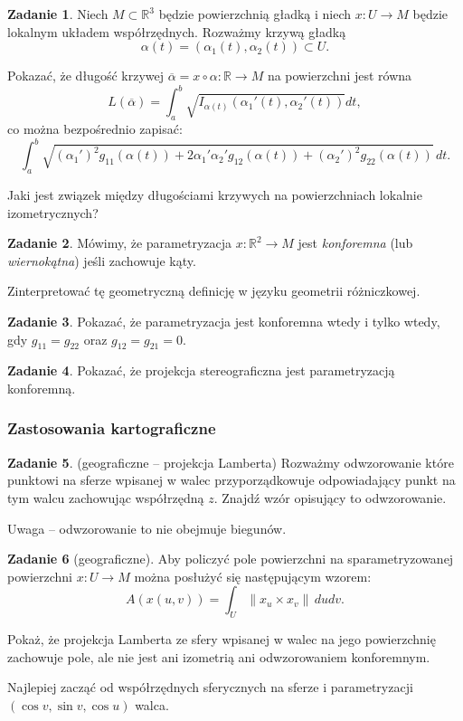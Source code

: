 \documentclass[a4paper,11pt]{article}
\theoremstyle{definition}\newtheorem{exercise}{Zadanie}
\theoremstyle{definition}\newtheorem{remark}{Uwaga}
\begin{document}
\begin{exercise}
Niech $M\subset \mathbb{R}^3$ będzie powierzchnią gładką i niech $x\colon U\to 
M$ będzie lokalnym układem współrzędnych. Rozważmy krzywą gładką 
\[\alpha(t)=(\alpha_1(t),\alpha_2(t))\subset U.\]

Pokazać, że długość krzywej $\overline{\alpha}=x\circ\alpha\colon \mathbb{R}\to 
M$ na powierzchni jest równa
\[L(\overline{\alpha})=\int_a^b\sqrt{I_{\alpha(t)}\left(\alpha_1 '(t),\alpha_2 
'(t)\right)}dt,\]
co można bezpośrednio zapisać:
\[\int_a^b\sqrt{\left(\alpha_1'\right)^2 g_{11}(\alpha(t))+ 2 
\alpha_1'\alpha_2'g_{12}(\alpha(t))+\left(\alpha_2'\right)^2 
g_{22}(\alpha(t))}\,dt.\]

Jaki jest związek między długościami krzywych na powierzchniach lokalnie 
izometrycznych?
\end{exercise} 
 

\begin{exercise}
 M\'owimy, że parametryzacja $x\colon \mathbb{R}^2\to M$ jest 
\textit{konforemna} (lub \textit{wiernokątna}) jeśli zachowuje kąty.

Zinterpretować tę geometryczną definicję w języku geometrii r\'ożniczkowej.
\end{exercise}
 
\begin{exercise}
 Pokazać, że parametryzacja jest konforemna wtedy i tylko wtedy, gdy $g_{11} 
=g_{22} $ oraz $g_{12} =g_{21} =0$.
\end{exercise}

\begin{exercise}
 Pokazać, że projekcja stereograficzna jest parametryzacją konforemną.
\end{exercise}

\subsubsection{Zastosowania kartograficzne}

\begin{exercise}(geograficzne -- projekcja Lamberta)
Rozważmy odwzorowanie kt\'ore punktowi na sferze wpisanej w walec 
przyporządkowuje odpowiadający punkt na tym walcu zachowując wsp\'ołrzędną $z$. 
Znajdź wz\'or opisujący to odwzorowanie.

\small{Uwaga -- odwzorowanie to nie obejmuje biegun\'ow.}
\end{exercise}


\begin{exercise}[geograficzne]
Aby policzyć pole powierzchni na sparametryzowanej powierzchni $x\colon U\to M$ 
można posłużyć się następującym wzorem:
\[A\left(x(u,v)\right)=\int_U \|x_u \times x_v \|\, dudv.\]

Pokaż, że projekcja Lamberta ze sfery wpisanej w walec na jego 
powierzchnię zachowuje pole, ale nie jest ani izometrią ani  
odwzorowaniem konforemnym.

\small{Najlepiej zacząć od wsp\'ołrzędnych sferycznych na sferze i 
parametryzacji $(\cos v,\sin v, \cos u)$ walca.}
\end{exercise}
\end{document}
